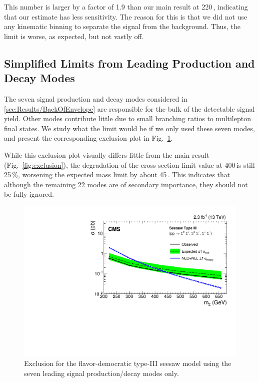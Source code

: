 This number is larger by a factor of 1.9 than our main result at 220\,\GeV, indicating that our estimate has less sensitivity. The reason for this is that we did not use any kinematic binning to separate the signal from the background. Thus, the limit is worse, as expected, but not vastly off.

\subsection{Simplified Limits from Leading Production and Decay Modes}
The seven signal production and decay modes considered in \ref{sec:Results/BackOfEnvelope} are responsible for the bulk of the detectable signal yield. Other modes contribute little due to small branching ratios to multilepton final states. We study what the limit would be if we only used these seven modes, and present the corresponding exclusion plot in Fig.~\ref{fig:exclusion-leading7}.

While this exclusion plot visually differs little from the main result (Fig.~\ref{fig:exclusion}), the degradation of the cross section limit value at 400\,\GeV is still 25\,\%, worsening the expected mass limit by about 45\,\GeV. This indicates that although the remaining 22 modes are of secondary importance, they should not be fully ignored.

\begin{figure}
\begin{center}
	\includegraphics[width=.8\textwidth]{Results/exclusion-leading7}
	\caption{Exclusion for the flavor-democratic type-III seesaw model using the seven leading signal production/decay modes only.
	\label{fig:exclusion-leading7}}
\end{center}
\end{figure}

